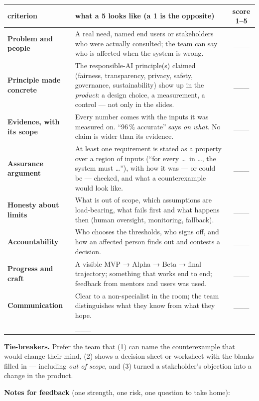 \documentclass[11pt]{article}
\begin{document}
\footnotesize
\begin{tabularx}{\textwidth}{@{}>{\bfseries}p{3.1cm}Xc@{}}
\toprule
criterion & what a 5 looks like (a 1 is the opposite) & score 1–5\\
\midrule
Problem and people & A real need, named end users or stakeholders who were actually consulted; the team can say who is affected when the system is wrong. & \rule{0pt}{5mm}\_\_\_\\
Principle made concrete & The responsible-AI principle(s) claimed (fairness, transparency, privacy, safety, governance, sustainability) show up in the \emph{product}: a design choice, a measurement, a control — not only in the slides. & \rule{0pt}{5mm}\_\_\_\\
Evidence, with its scope & Every number comes with the inputs it was measured on. ``96\,\% accurate'' says \emph{on what}. No claim is wider than its evidence. & \rule{0pt}{5mm}\_\_\_\\
Assurance argument & At least one requirement is stated as a property over a region of inputs (``for every \ldots\ in \ldots, the system must \ldots''), with how it was — or could be — checked, and what a counterexample would look like. & \rule{0pt}{5mm}\_\_\_\\
Honesty about limits & What is out of scope, which assumptions are load-bearing, what fails first and what happens then (human oversight, monitoring, fallback). & \rule{0pt}{5mm}\_\_\_\\
Accountability & Who chooses the thresholds, who signs off, and how an affected person finds out and contests a decision. & \rule{0pt}{5mm}\_\_\_\\
Progress and craft & A visible MVP → Alpha → Beta → final trajectory; something that works end to end; feedback from mentors and users was used. & \rule{0pt}{5mm}\_\_\_\\
Communication & Clear to a non-specialist in the room; the team distinguishes what they know from what they hope. & \rule{0pt}{5mm}\_\_\_\\
\midrule
\multicolumn{2}{r}{\textbf{total (of 40)}} & \rule{0pt}{5mm}\_\_\_\\
\bottomrule
\end{tabularx}
\vspace{2mm}
\begin{notebox}\footnotesize
\textbf{Tie-breakers.} Prefer the team that (1) can name the counterexample that would change their mind, (2) shows a decision sheet or worksheet with the blanks filled in — including \emph{out of scope}, and (3) turned a stakeholder's objection into a change in the product.
\end{notebox}
\vspace{1mm}
\begin{tcolorbox}[enhanced,colback=white,colframe=bpRule,boxrule=0.5pt,arc=0pt,height=4.6cm,left=2mm,right=2mm,top=1mm,bottom=1mm,fontupper=\footnotesize]
\textbf{Notes for feedback} (one strength, one risk, one question to take home):
\end{tcolorbox}
\end{document}

